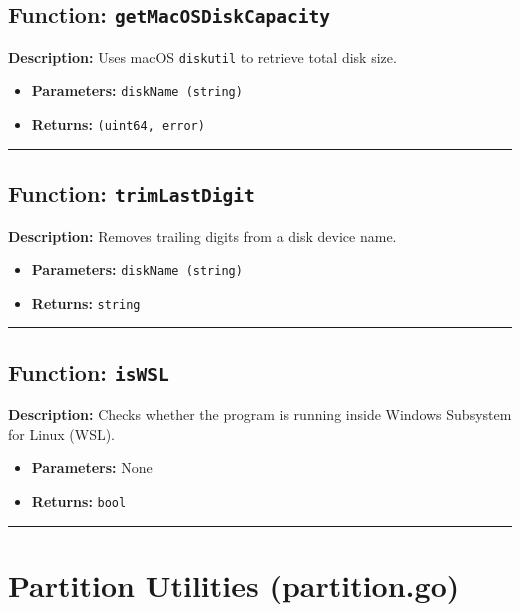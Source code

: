 \documentclass[12pt,a4paper]{article}
\begin{document}
\subsection*{Function: \texttt{getMacOSDiskCapacity}}
\textbf{Description:} Uses macOS \texttt{diskutil} to retrieve total disk size.
\begin{itemize}[leftmargin=2cm,label={--}]
  \item \textbf{Parameters:} \texttt{diskName (string)}
  \item \textbf{Returns:} \texttt{(uint64, error)}
\end{itemize}
\hrule\vspace{1em}

\subsection*{Function: \texttt{trimLastDigit}}
\textbf{Description:} Removes trailing digits from a disk device name.
\begin{itemize}[leftmargin=2cm,label={--}]
  \item \textbf{Parameters:} \texttt{diskName (string)}
  \item \textbf{Returns:} \texttt{string}
\end{itemize}
\hrule\vspace{1em}

\subsection*{Function: \texttt{isWSL}}
\textbf{Description:} Checks whether the program is running inside Windows Subsystem for Linux (WSL).
\begin{itemize}[leftmargin=2cm,label={--}]
  \item \textbf{Parameters:} None
  \item \textbf{Returns:} \texttt{bool}
\end{itemize}
\hrule\vspace{2em}

\newpage

\section{Partition Utilities (partition.go)}
\end{document}
